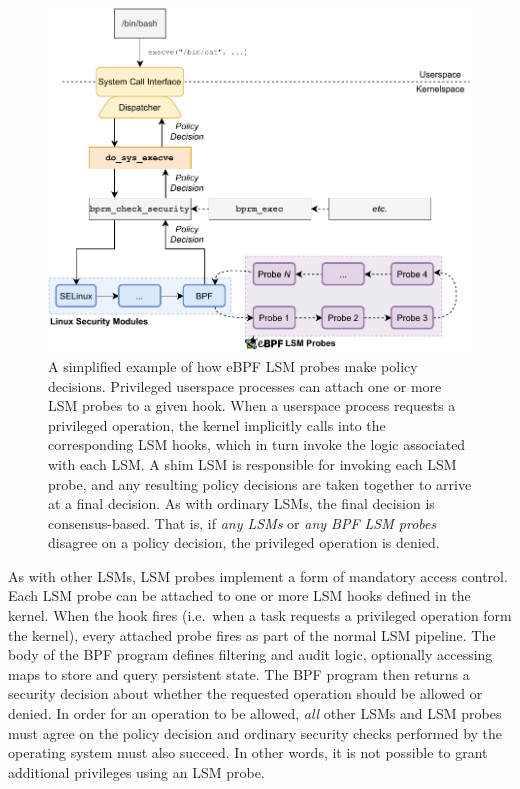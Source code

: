 \begin{figure}[tbp]
  \centering
  \includegraphics[width=0.8\linewidth]{figs/background/bpf-lsm.pdf}
  \caption{A simplified example of how eBPF LSM probes make policy decisions. Privileged userspace processes can attach one or more LSM probes to a given hook. When a userspace process requests a privileged operation, the kernel implicitly calls into the corresponding LSM hooks, which in turn invoke the logic associated with each LSM. A shim LSM is responsible for invoking each LSM probe, and any resulting policy decisions are taken together to arrive at a final decision. As with ordinary LSMs, the final decision is consensus-based. That is, if \textit{any LSMs} or \textit{any BPF LSM probes} disagree on a policy decision, the privileged operation is denied.}%
  \label{fig:bpf-lsm}
\end{figure}

As with other LSMs, LSM probes implement a form of mandatory access control. Each LSM
probe can be attached to one or more LSM hooks defined in the kernel. When the hook fires
(i.e.~when a task requests a privileged operation form the kernel), every attached probe
fires as part of the normal LSM pipeline. The body of the BPF program defines filtering
and audit logic, optionally accessing maps to store and query persistent state. The BPF
program then returns a security decision about whether the requested operation should be
allowed or denied.  In order for an operation to be allowed, \textit{all} other LSMs and
LSM probes must agree on the policy decision and ordinary security checks performed by the
operating system must also succeed. In other words, it is not possible to grant additional
privileges using an LSM probe.


